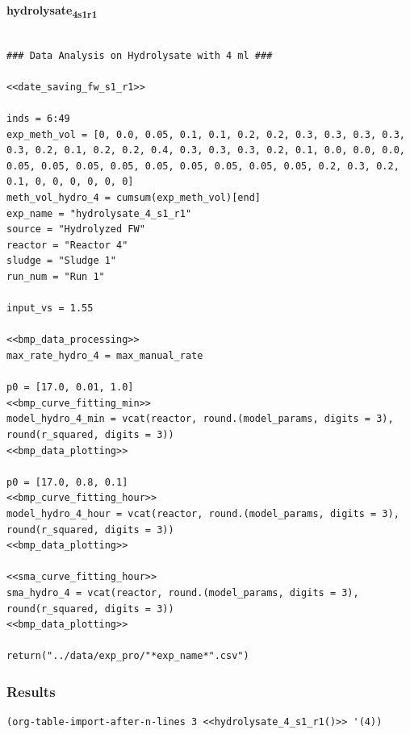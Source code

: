 \documentclass[11pt]{article}
\begin{document}
\textbf{hydrolysate\textsubscript{4}\textsubscript{s1}\textsubscript{r1}}
\begin{verbatim}

### Data Analysis on Hydrolysate with 4 ml ###

<<date_saving_fw_s1_r1>>

inds = 6:49
exp_meth_vol = [0, 0.0, 0.05, 0.1, 0.1, 0.2, 0.2, 0.3, 0.3, 0.3, 0.3, 0.3, 0.2, 0.1, 0.2, 0.2, 0.4, 0.3, 0.3, 0.3, 0.2, 0.1, 0.0, 0.0, 0.0, 0.05, 0.05, 0.05, 0.05, 0.05, 0.05, 0.05, 0.05, 0.05, 0.2, 0.3, 0.2, 0.1, 0, 0, 0, 0, 0, 0]
meth_vol_hydro_4 = cumsum(exp_meth_vol)[end]
exp_name = "hydrolysate_4_s1_r1"
source = "Hydrolyzed FW"
reactor = "Reactor 4"
sludge = "Sludge 1"
run_num = "Run 1"

input_vs = 1.55

<<bmp_data_processing>>
max_rate_hydro_4 = max_manual_rate

p0 = [17.0, 0.01, 1.0]
<<bmp_curve_fitting_min>>
model_hydro_4_min = vcat(reactor, round.(model_params, digits = 3), round(r_squared, digits = 3))
<<bmp_data_plotting>>

p0 = [17.0, 0.8, 0.1]
<<bmp_curve_fitting_hour>>
model_hydro_4_hour = vcat(reactor, round.(model_params, digits = 3), round(r_squared, digits = 3))
<<bmp_data_plotting>>

<<sma_curve_fitting_hour>>
sma_hydro_4 = vcat(reactor, round.(model_params, digits = 3), round(r_squared, digits = 3))
<<bmp_data_plotting>>

return("../data/exp_pro/"*exp_name*".csv")
\end{verbatim}

\subsubsection{Results}
\label{sec:org40180c6}

\begin{verbatim}
(org-table-import-after-n-lines 3 <<hydrolysate_4_s1_r1()>> '(4))
\end{verbatim}
\end{document}

